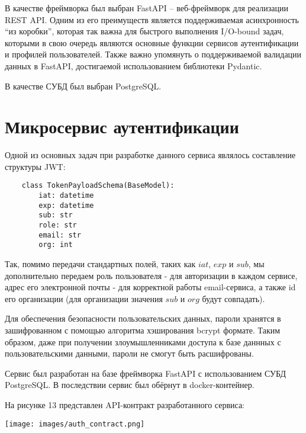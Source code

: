     В качестве фреймворка был выбран FastAPI \cite{fastapi} – веб-фреймворк для реализации REST API. Одним из его преимуществ является поддерживаемая асинхронность “из коробки”, которая так важна для быстрого выполнения I/O-bound задач, которыми в свою очередь являются основные функции сервисов аутентификации и профилей пользователей. Также важно упомянуть о поддерживаемой валидации данных в FastAPI, достигаемой использованием библиотеки Pydantic. \cite{pydantic}
    
    В качестве СУБД был выбран PostgreSQL.
    
    \section{Микросервис аутентификации}
    Одной из основных задач при разработке данного сервиса являлось составление структуры JWT:
    \begin{verbatim}
    class TokenPayloadSchema(BaseModel):
        iat: datetime
        exp: datetime
        sub: str
        role: str
        email: str
        org: int
    \end{verbatim}

    Так, помимо передачи стандартных полей, таких как $iat$, $exp$ и $sub$, мы дополнительно передаем роль пользователя - для авторизации в каждом сервисе, адрес его электронной почты - для корректной работы email-сервиса, а также id его организации (для организации значения $sub$ и $org$ будут совпадать). 

    Для обеспечения безопасности пользовательских данных, пароли хранятся в зашифрованном с помощью алгоритма хэширования bcrypt \cite{bcrypt} формате. Таким образом, даже при получении злоумышленниками доступа к базе даннных с пользовательскими данными, пароли не смогут быть расшифрованы. 

    Сервис был разработан на базе фреймворка FastAPI с использованием СУБД PostgreSQL. В последствии сервис был обёрнут в docker-контейнер. 
    
    На рисунке 13 представлен API-контракт разработанного сервиса:
        \noindent\begin{minipage}[t]{\textwidth}
                 \begin{center}
                 \texttt{[image: images/auth\_contract.png]}
                 \end{center} \label{fig:Moreno}
            
            \end{minipage}
            
